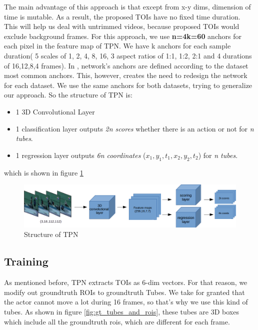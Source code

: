 \documentclass{report}
\begin{document}
The main advantage of this approach is that except from x-y dims, dimension of time is mutable. As a result, the proposed TOIs have
no fixed time duration. This will help us deal with untrimmed videos, because proposed TOIs would exclude background frames.
For this approach, we use \textbf{n=4k=60} anchors for each pixel in the feature map of TPN. We have k anchors for each sample
duration( 5 scales of 1, 2, 4, 8, 16, 3 aspect ratios of 1:1, 1:2, 2:1 and 4 durations of 16,12,8,4 frames).
In \cite{DBLP:journals/corr/HouCS17},  network's anchors are defined according to the dataset most common anchors. This, however,
creates the need to redesign the network for each dataset. We use the same anchors for both datasets, trying to generalize our
approach.
So the structure of TPN is:
\begin{itemize}
\item 1 3D Convolutional Layer
\item 1 classification layer outputs \textit{2n scores} whether there is an action or not for \textit{n tubes}.
\item 1 regression layer outputs \textit{6n coordinates} ($x_1,y_1,t_1,x_2,y_2,t_2$) for \textit{n tubes}.
\end{itemize}

which is shown in figure \ref{fig:tpn_1_1}
\begin{figure}[h]

  \includegraphics[width=1.\textwidth]{tpn_1_1}
  \caption{Structure of TPN}
  \label{fig:tpn_1_1}
\end{figure}



\subsection{Training}
As mentioned before, TPN extracts TOIs as 6-dim vectors. For that reason, we modify out groundtruth ROIs to groundtruth Tubes.
We take for granted that the actor cannot move a lot during 16 frames, so that's why we use this kind of tubes. As shown 
in figure \ref{fig:gt_tubes_and_rois}, these tubes are 3D boxes which include all the groundtruth rois, which are different
for each frame.
\end{document}
